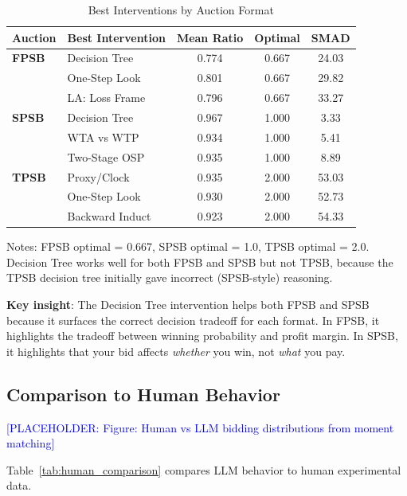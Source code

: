 \documentclass[12pt]{article}
\newcommand{\placeholder}[1]{\textcolor{blue}{[PLACEHOLDER: #1]}}
\begin{document}
\begin{table}[h]
\centering
\caption{Best Interventions by Auction Format}
\label{tab:fpsb_vs_spsb}
\begin{tabular}{llccc}
\toprule
Auction & Best Intervention & Mean Ratio & Optimal & SMAD \\
\midrule
\textbf{FPSB} & Decision Tree & 0.774 & 0.667 & 24.03 \\
& One-Step Look & 0.801 & 0.667 & 29.82 \\
& LA: Loss Frame & 0.796 & 0.667 & 33.27 \\
\midrule
\textbf{SPSB} & Decision Tree & 0.967 & 1.000 & 3.33 \\
& WTA vs WTP & 0.934 & 1.000 & 5.41 \\
& Two-Stage OSP & 0.935 & 1.000 & 8.89 \\
\midrule
\textbf{TPSB} & Proxy/Clock & 0.935 & 2.000 & 53.03 \\
& One-Step Look & 0.930 & 2.000 & 52.73 \\
& Backward Induct & 0.923 & 2.000 & 54.33 \\
\bottomrule
\end{tabular}
\smallskip
\begin{minipage}{0.9\textwidth}
\footnotesize
Notes: FPSB optimal = 0.667, SPSB optimal = 1.0, TPSB optimal = 2.0. Decision Tree works well for both FPSB and SPSB but not TPSB, because the TPSB decision tree initially gave incorrect (SPSB-style) reasoning.
\end{minipage}
\end{table}

\textbf{Key insight}: The Decision Tree intervention helps both FPSB and SPSB because it surfaces the correct decision tradeoff for each format. In FPSB, it highlights the tradeoff between winning probability and profit margin. In SPSB, it highlights that your bid affects \emph{whether} you win, not \emph{what} you pay.

\subsection{Comparison to Human Behavior}

\placeholder{Figure: Human vs LLM bidding distributions from moment matching}

Table~\ref{tab:human_comparison} compares LLM behavior to human experimental data.
\end{document}
